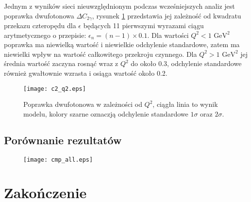 \documentclass[11pt]{book}
\theoremstyle{definition}
\begin{document}
Jednym z wyników sieci nieuwzględnionym podczas wcześniejszych analiz jest poprawka dwufotonowa $\Delta C_{2\gamma}$, rysunek \ref{fig:c2} przedstawia jej zależność od kwadratu przekazu czteropędu dla $\epsilon$ będących 11 pierwszymi wyrazami ciągu arytmetycznego o przepisie: $\epsilon_n = (n-1) \times 0.1$. Dla wartości $Q^2 < 1 \text{ GeV}^2$ poprawka ma niewielką wartość i niewielkie odchylenie standardowe, zatem ma niewielki wpływ na wartość całkowitego przekroju czynnego.  Dla $Q^2 > 1 \text{ GeV}^2$ jej średnia wartość zaczyna rosnąć wraz z $Q^2$ do około 0.3, odchylenie standardowe również gwałtownie wzrasta i osiąga wartość około 0.2.



\begin{figure}[hp!]
	\centering
	\texttt{[image: c2\_q2.eps]}
	\caption{Poprawka dwufotonowa w zależności od $Q^2$, ciągła linia to wynik modelu, kolory szarne oznaczją odchylenie standardowe $1\sigma$ oraz $2\sigma$.} 
	\label{fig:c2}
\end{figure}


\section[\color{red}Porównanie rezultatów]{Porównanie rezultatów}


\begin{figure}[hp!]
	\centering
	\texttt{[image: cmp\_all.eps]}
	\caption{} 
	\label{fig:cmp_all}
\end{figure}

\chapter[\color{red}Zakończenie]{Zakończenie}




\end{document}
